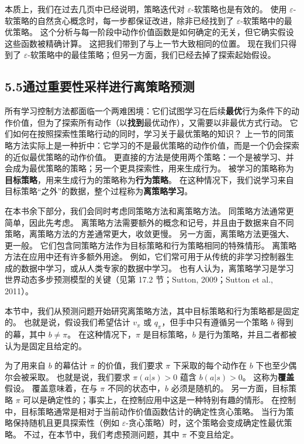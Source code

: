 \documentclass[UTF8,12pt,a4paper,fontset=fandol]{ctexart}
\begin{document}
本质上，我们在过去几页中已经说明，策略迭代对 $\varepsilon$-软策略也是有效的。
使用 $\varepsilon$-软策略的自然贪心概念时，每一步都保证改进，除非已经找到了 $\varepsilon$-软策略中的最优策略。
这个分析与每一阶段中动作价值函数是如何确定的无关，但它确实假设这些函数被精确计算。
这把我们带到了与上一节大致相同的位置。
现在我们只得到了 $\varepsilon$-软策略中的最佳策略；但另一方面，我们已经去掉了探索起始假设。

\subsection*{5.5\quad 通过重要性采样进行离策略预测}

所有学习控制方法都面临一个两难困境：它们试图学习在后续\textbf{最优}行为条件下的动作价值，但为了探索所有动作（以\textbf{找到}最优动作），又需要以非最优方式行动。
它们如何在按照探索性策略行动的同时，学习关于最优策略的知识？
上一节的同策略方法实际上是一种折中：它学习的不是最优策略的动作价值，而是一个仍会探索的近似最优策略的动作价值。
更直接的方法是使用两个策略：一个是被学习、并会成为最优策略的策略；另一个更具探索性，用来生成行为。
被学习的策略称为\textbf{目标策略}，用来生成行为的策略称为\textbf{行为策略}。
在这种情况下，我们说学习来自目标策略“之外”的数据，整个过程称为\textbf{离策略学习}。

在本书余下部分，我们会同时考虑同策略方法和离策略方法。
同策略方法通常更简单，因此先考虑。
离策略方法需要额外的概念和记号，并且由于数据来自不同策略，离策略方法的方差通常更大，收敛更慢。
另一方面，离策略方法更强大、更一般。
它们包含同策略方法作为目标策略和行为策略相同的特殊情形。
离策略方法在应用中还有许多额外用途。
例如，它们常可用于从传统的非学习控制器生成的数据中学习，或从人类专家的数据中学习。
也有人认为，离策略学习是学习世界动态多步预测模型的关键（见第 17.2 节；Sutton, 2009；Sutton et al., 2011）。

本节中，我们从预测问题开始研究离策略方法，其中目标策略和行为策略都是固定的。
也就是说，假设我们希望估计 $v_\pi$ 或 $q_\pi$，但手中只有遵循另一个策略 $b$ 得到的幕，其中 $b\ne\pi$。
在这种情况下，$\pi$ 是目标策略，$b$ 是行为策略，并且二者都被认为是固定且给定的。

为了用来自 $b$ 的幕估计 $\pi$ 的价值，我们要求 $\pi$ 下采取的每个动作在 $b$ 下也至少偶尔会被采取。
也就是说，我们要求 $\pi(a|s)>0$ 蕴含 $b(a|s)>0$。
这称为\textbf{覆盖}假设。
覆盖意味着，在与 $\pi$ 不同的状态中，$b$ 必须是随机的。
另一方面，目标策略 $\pi$ 可以是确定性的；事实上，在控制应用中这是一种特别有趣的情形。
在控制中，目标策略通常是相对于当前动作价值函数估计的确定性贪心策略。
当行为策略保持随机且更具探索性（例如 $\varepsilon$-贪心策略）时，这个策略会变成确定性最优策略。
不过，在本节中，我们考虑预测问题，其中 $\pi$ 不变且给定。
\end{document}
